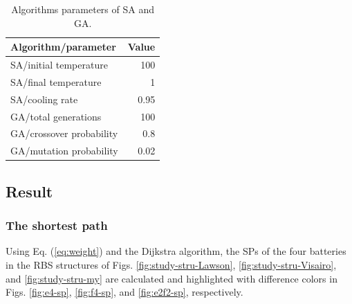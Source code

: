 \documentclass{article}
\begin{document}
\begin{table}[htbp]
  \centering
  \caption{Algorithms parameters of SA and GA.}
    \begin{tabular}{lr}
    \toprule
    Algorithm/parameter & \multicolumn{1}{l}{Value} \\
    \midrule
    SA/initial temperature & 100 \\
    SA/final temperature & 1 \\
    SA/cooling rate & 0.95 \\
    GA/total generations & 100 \\
    GA/crossover probability & 0.8 \\
    GA/mutation probability & 0.02 \\
    \bottomrule
    \end{tabular}
  \label{tab:algorithm-parameter}
\end{table}

\subsection{Result}

\subsubsection{The shortest path}

Using Eq. (\ref{eq:weight}) and the Dijkstra algorithm, the SPs of the four batteries in the RBS structures of Figs. \ref{fig:study-stru-Lawson}, \ref{fig:study-stru-Visairo}, and \ref{fig:study-stru-my} are calculated and highlighted with difference colors in Figs. \ref{fig:e4-sp}, \ref{fig:f4-sp}, and \ref{fig:e2f2-sp}, respectively.
\end{document}
